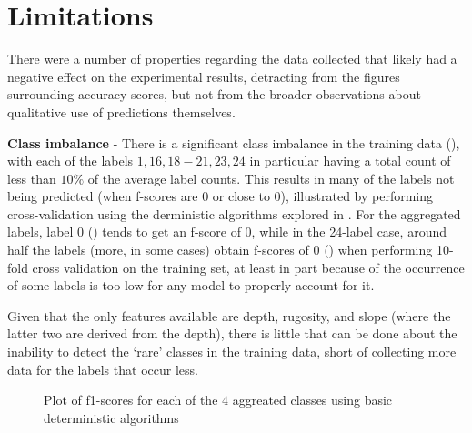 \section{Limitations}

There were a number of properties regarding the data collected that likely had a negative effect on the experimental results, detracting from the figures surrounding accuracy scores, but not from the broader observations about qualitative use of predictions themselves.

\textbf{Class imbalance} -  There is a significant class imbalance in the training data (), with each of the labels $1, 16, 18-21, 23, 24$ in particular having a total count of less than $10\%$ of the average label counts. This results in many of the labels not being predicted (when f-scores are $0$ or close to $0$), illustrated by performing cross-validation using the derministic algorithms explored in . For the aggregated labels, label $0$ () tends to get an f-score of 0, while in the 24-label case, around half the labels (more, in some cases) obtain f-scores of $0$ () when performing 10-fold cross validation on the training set, at least in part because of the occurrence of some labels is too low for any model to properly account for it. 

Given that the only features available are depth, rugosity, and slope (where the latter two are derived from the depth), there is little that can be done about the inability to detect the `rare' classes in the training data, short of collecting more data for the labels that occur less. 

\begin{figure}
    \caption{Plot of f1-scores for each of the $4$ aggreated classes using basic deterministic algorithms}
    \label{fig:det4_f1s}
\end{figure}

